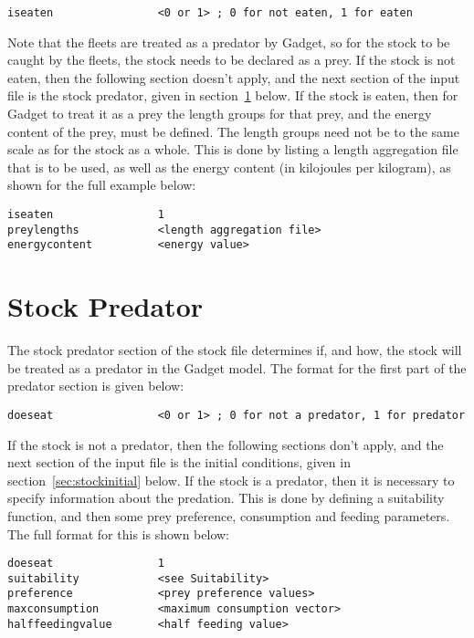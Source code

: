 \documentclass[10pt,twoside]{book}
\begin{document}
{\small\begin{verbatim}
iseaten                <0 or 1> ; 0 for not eaten, 1 for eaten
\end{verbatim}}

Note that the fleets are treated as a predator by Gadget, so for the stock to be caught by the fleets, the stock needs to be declared as a prey.  If the stock is not eaten, then the following section doesn't apply, and the next section of the input file is the stock predator, given in section~\ref{sec:stockpredator} below.  If the stock is eaten, then for Gadget to treat it as a prey the length groups for that prey, and the energy content of the prey, must be defined.  The length groups need not be to the same scale as for the stock as a whole.  This is done by listing a length aggregation file that is to be used, as well as the energy content (in kilojoules per kilogram), as shown for the full example below:

{\small\begin{verbatim}
iseaten                1
preylengths            <length aggregation file>
energycontent          <energy value>
\end{verbatim}}

\section{Stock Predator}\label{sec:stockpredator}
The stock predator section of the stock file determines if, and how, the stock will be treated as a predator in the Gadget model.  The format for the first part of the predator section is given below:

{\small\begin{verbatim}
doeseat                <0 or 1> ; 0 for not a predator, 1 for predator
\end{verbatim}}

If the stock is not a predator, then the following sections don't apply, and the next section of the input file is the initial conditions, given in section~\ref{sec:stockinitial} below.  If the stock is a predator, then it is necessary to specify information about the predation.  This is done by defining a suitability function, and then some prey preference, consumption and feeding parameters.  The full format for this is shown below:

{\small\begin{verbatim}
doeseat                1
suitability            <see Suitability>
preference             <prey preference values>
maxconsumption         <maximum consumption vector>
halffeedingvalue       <half feeding value>
\end{verbatim}}
\end{document}
